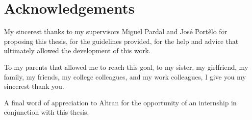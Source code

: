 %

\chapter*{Acknowledgements}
\thispagestyle{empty}

My sincerest thanks to my supervisors Miguel Pardal and Jos\'{e} Port\^{e}lo for proposing this thesis, for the guidelines provided, for the help and advice that ultimately allowed the development of this work.

To my parents that allowed me to reach this goal, to my sister, my girlfriend, my family, my friends, my college colleagues, and my work colleagues, I give you my sincerest thank you.

A final word of appreciation to Altran for the opportunity of an internship in conjunction with this thesis.



\vfill
% 

\cleardoublepage
